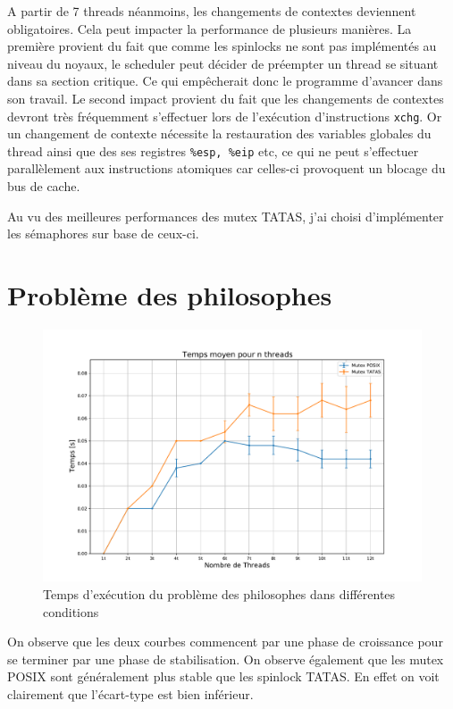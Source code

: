 \noindent A partir de 7 threads néanmoins, les changements de contextes deviennent obligatoires. Cela peut impacter la performance de plusieurs manières. La première provient du fait que comme les spinlocks ne sont pas implémentés au niveau du noyaux, le scheduler peut décider de préempter un thread se situant dans sa section critique. Ce qui empêcherait donc le programme d'avancer dans son travail. Le second impact provient du fait que les changements de contextes devront très fréquemment s'effectuer lors de l'exécution d'instructions \texttt{xchg}. Or un changement de contexte nécessite la restauration des variables globales du thread ainsi que des ses registres \texttt{\%esp, \%eip} etc, ce qui ne peut s'effectuer parallèlement aux instructions atomiques car celles-ci provoquent un blocage du bus de cache.

\noindent Au vu des meilleures performances des mutex TATAS, j'ai choisi d'implémenter les sémaphores sur base de ceux-ci.
\section{Problème des philosophes}

\begin{figure}[H]
    \centering
    \includegraphics[scale=0.4]{img/philosophes.pdf}
    \caption{Temps d'exécution du problème des philosophes dans différentes conditions}
    \label{pic:philo}
\end{figure}

\noindent On observe que les deux courbes commencent par une phase de croissance pour se terminer par une phase de stabilisation.
On observe également que les mutex POSIX sont généralement plus stable que les spinlock TATAS. En effet on voit clairement que l'écart-type est bien inférieur. \\

